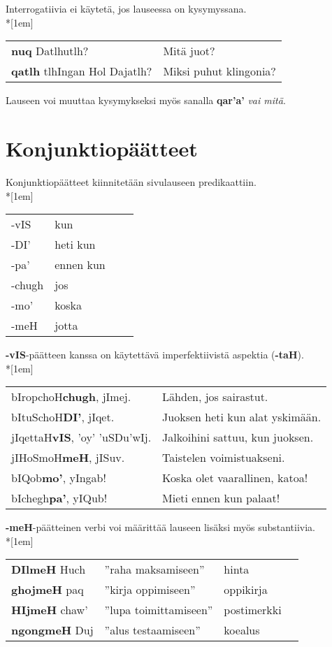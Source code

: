 \documentclass{book}
\begin{document}
Interrogatiivia ei käytetä, jos lauseessa on kysymyssana.\\*[1em]
\begin{tabular}{l l}
    \textbf{nuq} Datlhutlh? & Mitä juot? \\
    \textbf{qatlh} tlhIngan Hol Dajatlh? & Miksi puhut klingonia? \\
\end{tabular}

Lauseen voi muuttaa kysymykseksi myös sanalla \textbf{qar'a'} \textit{vai mitä}.

\section{Konjunktiopäätteet}
\label{sec:konjunktiopaate}

Konjunktiopäätteet kiinnitetään sivulauseen predikaattiin.\\*[1em]
\begin{tabular}{Bl Il}
    -vIS & kun \\
    -DI' & heti kun \\
    -pa' & ennen kun \\
    -chugh & jos \\
    -mo' & koska \\
    -meH & jotta \\
\end{tabular}

\textbf{-vIS}-päätteen kanssa on käytettävä imperfektiivistä aspektia (\textbf{-taH}).\\*[1em]
\begin{tabular}{l l}
    bIropchoH\textbf{chugh}, jImej. & Lähden, jos sairastut. \\
    bItuSchoH\textbf{DI'}, jIqet. & Juoksen heti kun alat yskimään. \\
    jIqettaH\textbf{vIS}, 'oy' 'uSDu'wIj. & Jalkoihini sattuu, kun juoksen. \\
    jIHoSmoH\textbf{meH}, jISuv. & Taistelen voimistuakseni. \\
    bIQob\textbf{mo'}, yIngab! & Koska olet vaarallinen, katoa! \\
    bIchegh\textbf{pa'}, yIQub! & Mieti ennen kun palaat! \\
\end{tabular}

\textbf{-meH}-päätteinen verbi voi määrittää lauseen lisäksi myös substantiivia.\\*[1em]
\begin{tabular}{l l Il}
    \textbf{DIlmeH} Huch & ''raha maksamiseen'' & hinta \\
    \textbf{ghojmeH} paq & ''kirja oppimiseen'' & oppikirja \\
    \textbf{HIjmeH} chaw' & ''lupa toimittamiseen'' & postimerkki \\
    \textbf{ngongmeH} Duj & ''alus testaamiseen'' & koealus \\
\end{tabular}
\end{document}

